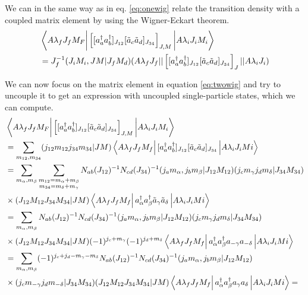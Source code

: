 \documentclass[12pt,a4paper]{article}
\newcommand{\matrixel}[3]{\left\langle #1 \vphantom{#2#3} \right|
 #2 \left| #3 \vphantom{#1#2} \right\rangle} %
\begin{document}
We can in the same way as in eq. \ref{eq:onewig} relate the transition density with a coupled matrix element by using the Wigner-Eckart theorem.
\begin{align}
\begin{split}
&\matrixel{A\lambda_f J_f M_F}{\left[[a^\dagger_a a^\dagger_b]_{J_{12}}[\tilde{a}_c\tilde{a}_d]_{J_{34}}\right]_{J,M}}{A\lambda_i  J_i M_i}\\
&=J_{f}^{-1}(J_iM_i, J M |J_fM_d)(A\lambda_f J_f||\left[[a^\dagger_a a^\dagger_b]_{J_{12}}[\tilde{a}_c\tilde{a}_d]_{J_{34}}\right]_{J}||A\lambda_i J_i )
\label{eq:twowig}
\end{split}
\end{align}

We can now focus on the matrix element in equation \ref{eq:twowig} and try to uncouple it to get an expression with uncoupled single-particle states, which we can compute.
\begin{align}
\begin{split}
&\matrixel{A\lambda_f J_f M_F}{\left[[a^\dagger_a a^\dagger_b]_{J_{12}}[\tilde{a}_c\tilde{a}_d]_{J_{34}}\right]_{J,M}}{A\lambda_i  J_i M_i}\\
&=\sum_{m_{12},m_{34}}(j_{12}m_{12}j_{34}m_{34}|J M)\matrixel{A\lambda_f J_f M_f}{[a^\dagger_a a^\dagger_b]_{J_{12}}[\tilde{a}_c\tilde{a}_d]_{J_{34}}}{A \lambda_i J_i Mi} \\
&=\sum_{m_{\alpha},m_{\beta}} \sum_{\substack{m_{12}=m_{\alpha}+m_{\beta}\\m_{34}=m_{\delta}+m_{\gamma}}} N_{ab}(J_{12})^{-1}N_{cd}(J_{34})^{-1}(j_a m_{\alpha},j_bm_{\beta}|J_{12}M_{12})(j_cm_{\gamma}j_dm_{\delta}|J_{34}M_{34})\\
&\times (J_{12}M_{12}J_{34}M_{34}|JM)\matrixel{A\lambda_f J_f M_f}{a^\dagger_\alpha a^\dagger_{\beta}\tilde{a}_\gamma \tilde{a}_\delta}{A \lambda_i J_i Mi}\\
&=\sum_{m_{\alpha},m_{\beta}} N_{ab}(J_{12})^{-1}N_{cd}(J_{34})^{-1}(j_a m_{\alpha},j_bm_{\beta}|J_{12}M_{12})(j_cm_{\gamma}j_dm_{\delta}|J_{34}M_{34})\\
&\times (J_{12}M_{12}J_{34}M_{34}|JM)(-1)^{j_c+m_{\gamma}}(-1)^{j_d+m_{\delta}}\matrixel{A\lambda_f J_f M_f}{a^\dagger_\alpha a^\dagger_{\beta}a_{-\gamma }a_{-\delta}}{A \lambda_i J_i Mi} \\
&=\sum_{m_{\alpha},m_{\beta}} (-1)^{j_c+j_d-m_{\gamma}-m_{\delta} }N_{ab}(J_{12})^{-1}N_{cd}(J_{34})^{-1}(j_a m_{\alpha},j_bm_{\beta}|J_{12}M_{12})\\
&\times(j_cm_{-\gamma}j_dm_{-\delta}|J_{34}M_{34}) (J_{12}M_{12}J_{34}M_{34}|JM)\matrixel{A\lambda_f J_f M_f}{a^\dagger_\alpha a^\dagger_{\beta}a_{\gamma }a_{\delta}}{A \lambda_i J_i Mi}= \\
\end{split}
\end{align}
\end{document}
